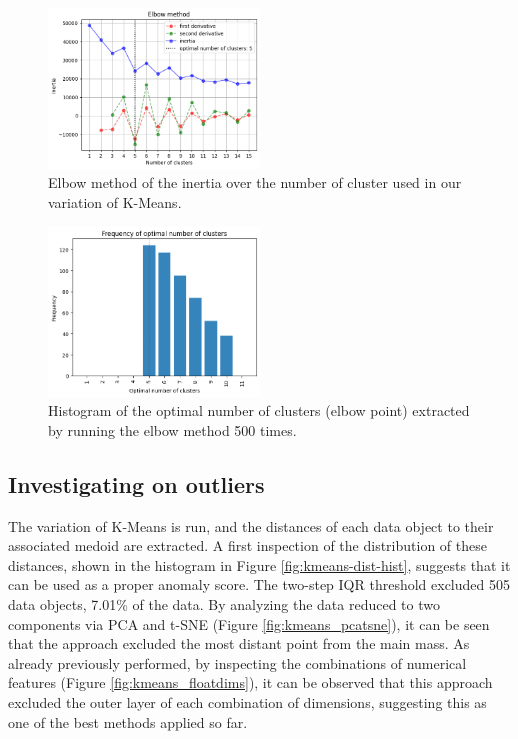 \documentclass[9pt,twocolumn]{article}
\begin{document}
\begin{figure}[h]
    \centering
    \includegraphics[width=0.5\textwidth]{images/KM_elbowmethod.png}
    \caption{Elbow method of the inertia over the number of cluster used in our variation of K-Means.}
    \label{fig:elbow-method}
\end{figure}

\begin{figure}[h]
    \centering
    \includegraphics[width=0.5\textwidth]{images/KM_kopthist.png}
    \caption{Histogram of the optimal number of clusters (elbow point) extracted by running the elbow method 500 times.}
    \label{fig:opt-k-hist}
\end{figure}

\subsection{Investigating on outliers}
The variation of K-Means is run, and the distances of each data object to their associated medoid are extracted. A first inspection of the distribution of these distances, shown in the histogram in Figure \ref{fig:kmeans-dist-hist}, suggests that it can be used as a proper anomaly score. The two-step IQR threshold excluded 505 data objects, 7.01\% of the data.
By analyzing the data reduced to two components via PCA and t-SNE (Figure \ref{fig:kmeans_pcatsne}), it can be seen that the approach excluded the most distant point from the main mass. As already previously performed, by inspecting the combinations of numerical features (Figure \ref{fig:kmeans_floatdims}), it can be observed that this approach excluded the outer layer of each combination of dimensions, suggesting this as one of the best methods applied so far.
\end{document}
